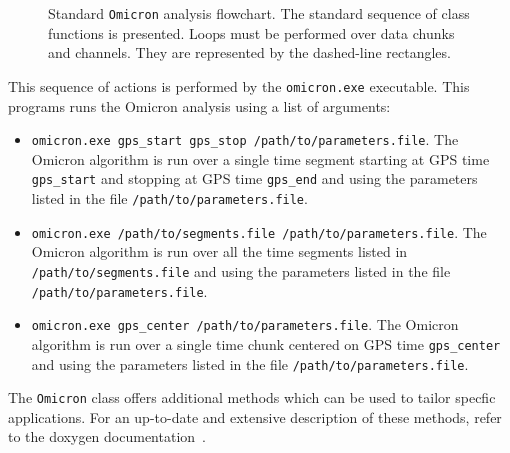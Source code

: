 \begin{figure}
  \center
  \caption{Standard \texttt{Omicron} analysis flowchart. The standard sequence of class functions is presented. Loops must be performed over data chunks and channels. They are represented by the dashed-line rectangles.}
  \label{fig:omicron_flowchart}
\end{figure}

This sequence of actions is performed by the \texttt{omicron.exe} executable. This programs runs the Omicron analysis using a list of arguments:
\begin{itemize}
  \item \texttt{omicron.exe gps\_start gps\_stop /path/to/parameters.file}. The Omicron algorithm is run over a single time segment starting at GPS time \texttt{gps\_start} and stopping at GPS time \texttt{gps\_end} and using the parameters listed in the file \texttt{/path/to/parameters.file}.
  \item \texttt{omicron.exe /path/to/segments.file /path/to/parameters.file}. The Omicron algorithm is run over all the time segments listed in \texttt{/path/to/segments.file} and using the parameters listed in the file\\
    \texttt{/path/to/parameters.file}.
  \item \texttt{omicron.exe gps\_center /path/to/parameters.file}. The Omicron algorithm is run over a single time chunk centered on GPS time \texttt{gps\_center} and using the parameters listed in the file \texttt{/path/to/parameters.file}.
\end{itemize}
The \texttt{Omicron} class offers additional methods which can be used to tailor specfic applications. For an up-to-date and extensive description of these methods, refer to the doxygen documentation~\cite{Omicron_doxygen}.


